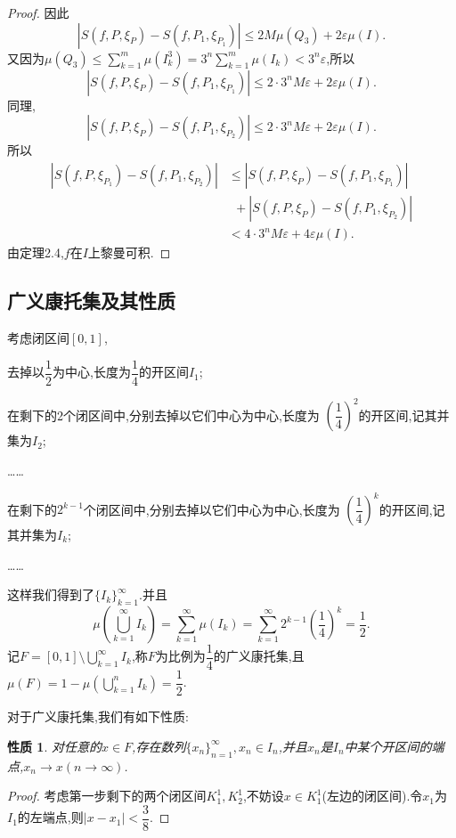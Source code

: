 \documentclass[a4paper,12pt]{article}
\newtheorem{proposition}[theorem]{性质}
\begin{document}
{\begin{proof}
                因此$$|S(f,P,\xi_P)-S(f,P_1,\xi_{P_1})|\leqslant 2M\mu(Q_3)+2\varepsilon\mu(I).$$
                又因为$\mu(Q_3)\leqslant\sum_{k=1}^m\mu(I_k^3)=3^n\sum_{k=1}^m\mu(I_k)<3^n\varepsilon$,所以
                $$|S(f,P,\xi_P)-S(f,P_1,\xi_{P_1})|\leqslant 2\cdot 3^nM\varepsilon+2\varepsilon\mu(I).$$
                同理,$$|S(f,P,\xi_P)-S(f,P_1,\xi_{P_2})|\leqslant 2\cdot 3^nM\varepsilon+2\varepsilon\mu(I).$$
                所以\begin{align*}
                    |S(f,P,\xi_{P_1})-S(f,P_1,\xi_{P_2})|&\leqslant|S(f,P,\xi_P)-S(f,P_1,\xi_{P_1})|\\
                    &~~+|S(f,P,\xi_P)-S(f,P_1,\xi_{P_2})|\\
                    &<4\cdot 3^nM\varepsilon+4\varepsilon\mu(I).
                \end{align*}
                由定理2.4,$f$在$I$上黎曼可积.
            \end{proof}

        \subsection{广义康托集及其性质}
            考虑闭区间$[0,1]$,
            
            \begin{enumerate*}
                \item[第1步]去掉以$\dfrac{1}{2}$为中心,长度为$\dfrac{1}{4}$的开区间$I_1$;
                \item[第2步]在剩下的2个闭区间中,分别去掉以它们中心为中心,长度为 $\left(\dfrac{1}{4}\right)^2$的开区间,记其并集为$I_2$;
            \end{enumerate*}
            \dots\dots
            \begin{enumerate*}
                \item[第$k$步]在剩下的$2^{k-1}$个闭区间中,分别去掉以它们中心为中心,长度为 $\left(\dfrac{1}{4}\right)^k$的开区间,记其并集为$I_k$;
            \end{enumerate*}
            \dots\dots

            这样我们得到了$\{I_k\}_{k=1}^\infty$.并且
            $$\mu\left(\bigcup_{k=1}^\infty I_k\right)=\sum_{k=1}^\infty\mu(I_k)=\sum_{k=1}^\infty2^{k-1}\left(\dfrac{1}{4}\right)^{k}=\dfrac{1}{2}.$$
            记$F=[0,1]\setminus\bigcup_{k=1}^\infty I_k$,称$F$为比例为$\dfrac{1}{4}$的广义康托集,且$\mu(F)=1-\mu\left(\bigcup_{k=1}^nI_k\right)=\dfrac{1}{2}$.

            对于广义康托集,我们有如下性质:
            \begin{proposition}
                对任意的$x\in F$,存在数列$\{x_n\}_{n=1}^\infty,x_n\in I_n$,并且$x_n$是$I_n$中某个开区间的端点,$x_n\to x(n\to\infty)$.
            \end{proposition}
            \begin{proof}
                考虑第一步剩下的两个闭区间$K_1^1,K_2^1$,不妨设$x\in K_1^1$(左边的闭区间).令$x_1$为$I_1$的左端点,则$|x-x_1|<\dfrac{3}{8}$.


\end{proof}}
\end{document}
